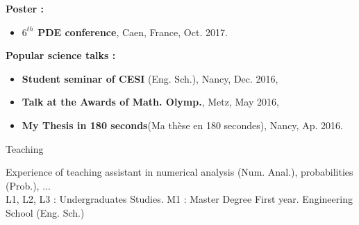 \documentclass[10pt,a4paper]{report}
\begin{document}
\vspace{0.3cm}
\noindent
{\selectfont
\textbf{Poster :}
}

\begin{itemize}
\item \textbf{$6^{th}$ PDE conference}, Caen, France, Oct. 2017.
\end{itemize}


\vspace{0.3cm}
\noindent
{\selectfont
\textbf{Popular science talks :}
}
\begin{itemize}
\item \textbf{Student seminar of CESI }(Eng. Sch.), Nancy, Dec. 2016,
\item \textbf{Talk at the Awards of Math. Olymp.}, Metz, May 2016,
\item \textbf{My Thesis in 180 seconds}(Ma thèse en 180 secondes), Nancy, Ap. 2016.
\end{itemize}

\vspace{.5cm}
\noindent
{\selectfont
\begin{Large}
Teaching
\end{Large}
\hrulefill
}
Experience of teaching assistant in numerical analysis (Num. Anal.), probabilities (Prob.), ...\\
L1, L2, L3 : Undergraduates Studies. M1 : Master Degree First year. Engineering School (Eng. Sch.)
\end{document}
